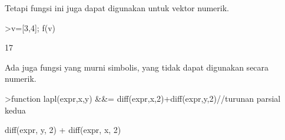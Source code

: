 \documentclass[a4paper,10pt]{article}
\begin{document}
\begin{eulernotebook}
\begin{eulercomment}
\begin{eulercomment}
\begin{eulercomment}
Tetapi fungsi ini juga dapat digunakan untuk vektor numerik.
\end{eulercomment}
\begin{eulerprompt}
>v=[3,4]; f(v)
\end{eulerprompt}
\begin{euleroutput}
  17
\end{euleroutput}
\begin{eulercomment}
Ada juga fungsi yang murni simbolis, yang tidak dapat digunakan secara
numerik.
\end{eulercomment}
\begin{eulerprompt}
>function lapl(expr,x,y) &&= diff(expr,x,2)+diff(expr,y,2)//turunan parsial kedua
\end{eulerprompt}
\begin{euleroutput}
  
                   diff(expr, y, 2) + diff(expr, x, 2)
  

\end{euleroutput}
\end{eulercomment}
\end{eulercomment}
\end{eulernotebook}
\end{document}
